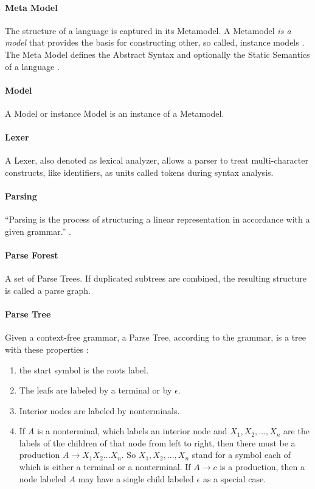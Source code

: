 \paragraph{Meta Model} The structure of a language is captured in its Metamodel. A Metamodel \emph{is a model} that provides the basis for constructing other, so called, instance models \cite{EMP}. The Meta Model defines the Abstract Syntax and optionally the Static Semantics of a language \cite{MDSD}.

\paragraph{Model} A Model or instance Model is an instance of a Metamodel.


\paragraph{Lexer}
A Lexer, also denoted as lexical analyzer, allows a parser to treat multi-character constructs, like identifiers, as units called tokens during syntax analysis. \cite{DragonBook}




\paragraph{Parsing} 
``Parsing is the process of structuring a linear representation in accordance with a given grammar.'' \cite{ParserBook}.

\paragraph{Parse Forest} 
A set of Parse Trees. If duplicated subtrees are combined, the resulting structure is called a parse graph. \cite{ParserBook}

\paragraph{Parse Tree}
Given a context-free grammar, a Parse Tree, according to the grammar, is a tree with these properties \cite{DragonBook}:
\begin{enumerate}
	\item the start symbol is the roots label.
	\item The leafs are labeled by a terminal or by $\epsilon$.
	\item Interior nodes are labeled by nonterminals.
	\item If $A$ is a nonterminal, which labels an interior node and $X_1, X_2, . . . , X_n$ are the labels of the children of that node from left to right, then there must be a production $A  \rightarrow X_1X_2 ... X_n$. So $X_1, X_2, ... , X_n$ stand for a symbol each of which is either a terminal or a nonterminal. If $A\rightarrow c$ is a production, then a node labeled $A$ may have a single child labeled $\epsilon$ as a special case. 
\end{enumerate}
